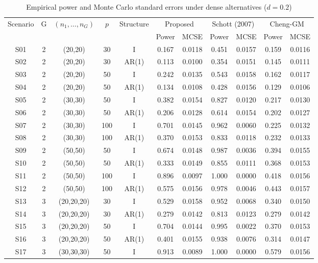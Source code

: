 \begin{table}[ht]
\centering
\caption{Empirical power and Monte Carlo standard errors under dense alternatives ($d = 0.2$)}
\label{tab:power_d20}
\scriptsize
\begin{tabular}{ccccccccccc}
\hline
Scenario & G & $(n_1,\ldots,n_G)$ & $p$ & Structure & \multicolumn{2}{c}{Proposed} & \multicolumn{2}{c}{Schott (2007)} & \multicolumn{2}{c}{Cheng-GM} \\
 & & & & & Power & MCSE & Power & MCSE & Power & MCSE \\
\hline
S01 & 2 & (20,20) & 30 & I & 0.167 & 0.0118 & 0.451 & 0.0157 & 0.159 & 0.0116 \\
S02 & 2 & (20,20) & 30 & AR(1) & 0.113 & 0.0100 & 0.354 & 0.0151 & 0.145 & 0.0111 \\
S03 & 2 & (20,20) & 50 & I & 0.242 & 0.0135 & 0.543 & 0.0158 & 0.162 & 0.0117 \\
S04 & 2 & (20,20) & 50 & AR(1) & 0.134 & 0.0108 & 0.428 & 0.0156 & 0.129 & 0.0106 \\
S05 & 2 & (30,30) & 50 & I & 0.382 & 0.0154 & 0.827 & 0.0120 & 0.217 & 0.0130 \\
S06 & 2 & (30,30) & 50 & AR(1) & 0.206 & 0.0128 & 0.614 & 0.0154 & 0.202 & 0.0127 \\
S07 & 2 & (30,30) & 100 & I & 0.701 & 0.0145 & 0.962 & 0.0060 & 0.225 & 0.0132 \\
S08 & 2 & (30,30) & 100 & AR(1) & 0.370 & 0.0153 & 0.833 & 0.0118 & 0.232 & 0.0133 \\
S09 & 2 & (50,50) & 50 & I & 0.674 & 0.0148 & 0.987 & 0.0036 & 0.394 & 0.0155 \\
S10 & 2 & (50,50) & 50 & AR(1) & 0.333 & 0.0149 & 0.855 & 0.0111 & 0.368 & 0.0153 \\
S11 & 2 & (50,50) & 100 & I & 0.896 & 0.0097 & 1.000 & 0.0000 & 0.418 & 0.0156 \\
S12 & 2 & (50,50) & 100 & AR(1) & 0.575 & 0.0156 & 0.978 & 0.0046 & 0.443 & 0.0157 \\
S13 & 3 & (20,20,20) & 30 & I & 0.529 & 0.0158 & 0.952 & 0.0068 & 0.340 & 0.0150 \\
S14 & 3 & (20,20,20) & 30 & AR(1) & 0.279 & 0.0142 & 0.813 & 0.0123 & 0.279 & 0.0142 \\
S15 & 3 & (20,20,20) & 50 & I & 0.704 & 0.0144 & 0.995 & 0.0022 & 0.370 & 0.0153 \\
S16 & 3 & (20,20,20) & 50 & AR(1) & 0.401 & 0.0155 & 0.938 & 0.0076 & 0.314 & 0.0147 \\
S17 & 3 & (30,30,30) & 50 & I & 0.913 & 0.0089 & 1.000 & 0.0000 & 0.579 & 0.0156 \\

\end{tabular}
\end{table}
